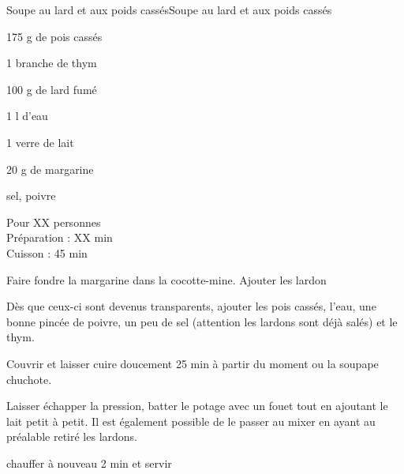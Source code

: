 \begin{recette}{Soupe au lard et aux poids cassés}{Soupe au lard et aux poids cassés}

\begin{ingredients}
175 g de pois cassés\par
1 branche de thym\par
100 g de lard fumé\par
1 l d'eau\par
1 verre de lait\par
20 g de margarine\par
sel, poivre\par
\end{ingredients}

\begin{infos}
Pour XX personnes\\
Préparation : XX min\\
Cuisson : 45 min\\
\end{infos}

\begin{etapes}
\item Faire fondre la margarine dans la cocotte-mine. Ajouter les lardon
\item Dès que ceux-ci sont devenus transparents, ajouter les pois cassés, l'eau, une bonne pincée de poivre, un peu de sel (attention les lardons sont déjà salés) et le thym.
\item Couvrir et laisser cuire doucement 25 min à partir du moment ou la soupape chuchote.
\item Laisser échapper la pression, batter le potage avec un fouet tout en ajoutant le lait petit à petit. Il est également possible de le passer au mixer en ayant au préalable retiré les lardons.
\item chauffer à nouveau 2 min et servir
\end{etapes}

\end{recette}